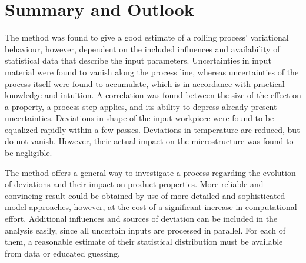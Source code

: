 \documentclass[DIV=13]{scrartcl}
\begin{document}
    


    \section{Summary and Outlook}\label{sec:summary}

    The method was found to give a good estimate of a rolling process' variational behaviour, however, dependent on the included influences and availability of statistical data that describe the input parameters.
    Uncertainties in input material were found to vanish along the process line, whereas uncertainties of the process itself were found to accumulate, which is in accordance with practical knowledge and intuition.
    A correlation was found between the size of the effect on a property, a process step applies, and its ability to depress already present uncertainties.
    Deviations in shape of the input workpiece were found to be equalized rapidly within a few passes.
    Deviations in temperature are reduced, but do not vanish.
    However, their actual impact on the microstructure was found to be negligible.

    The method offers a general way to investigate a process regarding the evolution of deviations and their impact on product properties.
    More reliable and convincing result could be obtained by use of more detailed and sophisticated model approaches, however, at the cost of a significant increase in computational effort.
    Additional influences and sources of deviation can be included in the analysis easily, since all uncertain inputs are processed in parallel.
    For each of them, a reasonable estimate of their statistical distribution must be available from data or educated guessing.

    

    \printbibliography
\end{document}
